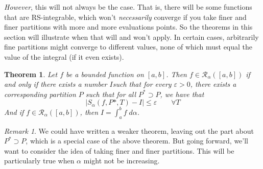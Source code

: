 \documentclass[12pt]{article}
\theoremstyle{plain}
\newtheorem{thm}{Theorem}[subsection]
\theoremstyle{definition}
\theoremstyle{remark}
\newtheorem*{rmk}{Remark}
\begin{document}
\emph{However}, this will not always be the case.  That is, there will be some functions that are RS-integrable, which won't \emph{necessarily} converge if you take finer and finer partitions with more and more evaluations points. So the theorems in this section will illustrate when that will and won't apply. In certain cases, arbitrarily fine partitions might converge to different values, none of which must equal the value of the integral (if it even exists).

\begin{thm}
\label{weaker}
Let $f$ be a bounded function on $[a,b]$. Then $f\in\mathscr{R}_\alpha([a,b])$ if and only if there exists a number $I$such that for every $\varepsilon>0$, there exists a corresponding partition $P$ such that for all $P^* \supset P$, we have that
    \[ |S_\alpha(f,P*,T) - I | \leq \varepsilon \qquad \forall T\]
And if $f\in\mathscr{R}_\alpha([a,b])$, then $I = \int^b_a f\;d\alpha$.
\end{thm}
\begin{rmk}
We could have written a weaker theorem, leaving out the part about $P^*\supset P$, which is a special case of the above theorem.  But going forward, we'll want to consider the idea of taking finer and finer partitions. This will be particularly true when $\alpha$ might not be increasing.
\end{rmk}
\end{document}
